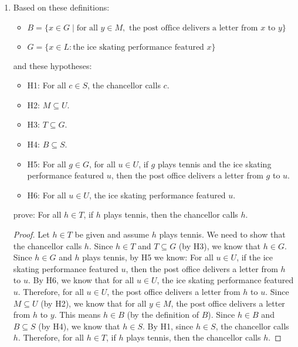 \documentclass{article}
\begin{document}
\begin{enumerate}
    \item Based on these definitions:
          \begin{itemize}
              \item $B = \{x \in G \mid \text{for all } y \in M, \text{ the post office delivers a letter from } x \text{ to } y\}$
              \item $G = \{x \in L : \text{the ice skating performance featured } x\}$
          \end{itemize}
          and these hypotheses:
          \begin{itemize}
              \item H1: For all $c \in S$, the chancellor calls $c$.
              \item H2: $M \subseteq U$.
              \item H3: $T \subseteq G$.
              \item H4: $B \subseteq S$.
              \item H5: For all $g \in G$, for all $u \in U$, if $g$ plays tennis and the ice
                    skating performance featured $u$, then the post office delivers a letter from
                    $g$ to $u$.
              \item H6: For all $u \in U$, the ice skating performance featured $u$.
          \end{itemize}
          prove: For all $h \in T$, if $h$ plays tennis, then the chancellor calls $h$.

          \begin{proof}
            Let $h \in T$ be given and assume $h$ plays tennis. We need to show that the chancellor calls $h$.
            Since $h \in T$ and $T \subseteq G$ (by H3), we know that $h \in G$.
            Since $h \in G$ and $h$ plays tennis, by H5 we know:
            For all $u \in U$, if the ice skating performance featured $u$, then the post office delivers a letter from $h$ to $u$.
            By H6, we know that for all $u \in U$, the ice skating performance featured $u$.
            Therefore, for all $u \in U$, the post office delivers a letter from $h$ to $u$.
            Since $M \subseteq U$ (by H2), we know that for all $y \in M$, the post office delivers a letter from $h$ to $y$.
            This means $h \in B$ (by the definition of $B$).
            Since $h \in B$ and $B \subseteq S$ (by H4), we know that $h \in S$.
            By H1, since $h \in S$, the chancellor calls $h$.
            Therefore, for all $h \in T$, if $h$ plays tennis, then the chancellor calls $h$.
          \end{proof}


\end{enumerate}
\end{document}
